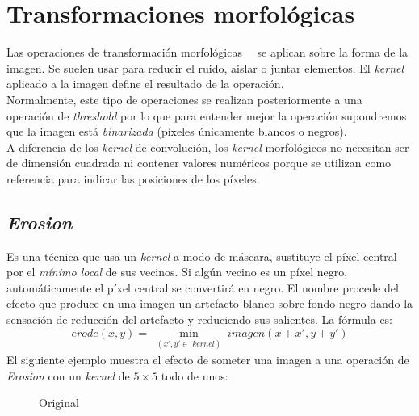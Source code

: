 \section{Transformaciones morfológicas}
Las operaciones de transformación morfológicas~\emph{\citep*[9
  Morphology]{fisher1996hypermedia}}~\emph{\citep*[Image
  Morphology]{opencv_book-bib}} se aplican sobre la forma de la
imagen. Se suelen usar para reducir el ruido, aislar o juntar
elementos. El \emph{kernel} aplicado a la imagen define el
resultado de la operación. \\
Normalmente, este tipo de operaciones se realizan posteriormente a una
operación de \emph{threshold} por lo que para entender mejor la
operación supondremos que la imagen está \emph{binarizada} (píxeles
únicamente blancos o negros). \\
A diferencia de los \emph{kernel} de convolución, los \emph{kernel}
morfológicos no necesitan ser de dimensión cuadrada ni contener
valores numéricos porque se utilizan como referencia para indicar las
posiciones de los píxeles.

\subsection{\emph{Erosion}}
Es una técnica que usa un \emph{kernel} a modo de máscara, sustituye
el píxel central por el \emph{mínimo local} de sus vecinos. Si algún
vecino es un píxel negro, automáticamente el píxel central se
convertirá en negro. El nombre procede del efecto que produce en una
imagen un artefacto blanco sobre fondo negro dando la sensación de
reducción del artefacto y reduciendo sus salientes. La fórmula es:
\begin{equation*}
  erode(x, y) = \min_{\substack{(x', y' \in \; kernel)}} imagen(x + x', y + y')
\end{equation*}
El siguiente ejemplo muestra el efecto de someter una imagen a una
operación de \emph{Erosion} con un \emph{kernel} de $5 \times 5$ todo
de unos:

\begin{figure}[H]
  \caption{Original}
  \centering \setlength\fboxsep{0pt} \setlength\fboxrule{0.5pt}
\end{figure}

